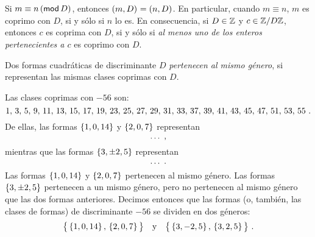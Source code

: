 \begin{obsGeneros}\label{obs:generos:clases-coprimas}
	Si $m\equiv n\tmodulo[D]$, entonces $\mcd{m,D}=\mcd{n,D}$.
	En particular, cuando $m\equiv n$, $m$ es coprimo con $D$, si
	y s\'olo si $n$ lo es. En consecuencia,
	si $D\in\Enteros$ y $c\in\Enterosmod[D]$, entonces $c$ es coprima
	con $D$, si y s\'olo si \emph{al menos uno de los enteros %
	pertenecientes a $c$} es coprimo con $D$.
\end{obsGeneros}

\begin{defGeneros}\label{def:generos}
	Dos formas cuadr\'aticas %
	de discriminante $D$ \emph{pertenecen al mismo g\'enero},
	si representan las mismas clases coprimas con $D$.
\end{defGeneros}

\begin{ejemGeneros}\label{ejem:generos:representacion:mod:bis}
	Las clases coprimas con $-56$ son:
	\begin{displaymath}
		1,\,3,\,5,\,9,\,
		11,\,13,\,15,\,17,\,
		19,\,23,\,25,\,27,\,
		29,\,31,\,33,\,37,\,
		39,\,41,\,43,\,45,\,
		47,\,51,\,53,\,55
		\dispstop
	\end{displaymath}
	De ellas, las formas $\binaria{1,0,14}$ y $\binaria{2,0,7}$
	representan
	\begin{displaymath}
		\dots
		\dispcomma
	\end{displaymath}
	mientras que las formas $\binaria{3,\pm 2,5}$ representan
	\begin{displaymath}
		\dots
		\dispstop
	\end{displaymath}
	Las formas $\binaria{1,0,14}$ y $\binaria{2,0,7}$ pertenecen al
	mismo g\'enero. Las formas $\binaria{3,\pm 2,5}$ pertenecen a
	un mismo g\'enero, pero no pertenecen al mismo g\'enero que
	las dos formas anteriores. Decimos entonces que las formas
	(o, tambi\'en, las clases de formas) de discriminante $-56$
	se dividen en dos g\'eneros:
	\begin{displaymath}
		\big\{
			\binaria{1,0,14},\,\binaria{2,0,7}
		\big\}\dispand
		\big\{
			\binaria{3,-2,5},\,\binaria{3,2,5}
		\big\}
		\dispstop
	\end{displaymath}
\end{ejemGeneros}

